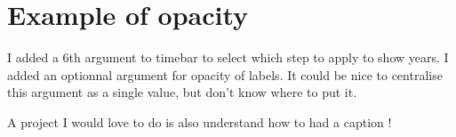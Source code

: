 \documentclass[12pt]{article}
\begin{document}
\thispagestyle{plain}

\section*{Example of opacity}

I added a 6th argument to timebar to select which step to apply to show years.
I added an optionnal argument for opacity of labels. 
It could be nice to centralise this argument as a single value, but don't know where to put it.

\begin{timeline}


\end{timeline}

A project I would love to do is also understand how to had a caption !


\newpage
\end{document}
